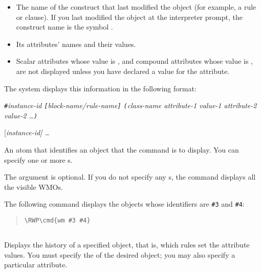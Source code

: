 {{\begin{itemize}
\item The name of the construct that last modified the object (for
  example, a rule or  clause). If you last modified the object
  at the interpreter prompt, the construct name is the symbol .

\item Its attributes' names and their values.

\item Scalar attributes whose value is , and compound attributes
  whose value is , are not displayed unless you have
  declared a  value for the attribute.
\end{itemize}

The system displays this information in the following format:

\verb|#|\it{instance-id} \verb|[|\it{block-name/rule-name}\verb|]| \verb|(|\it{class-name} \it{attribute-1} \it{value-1} \it{attribute-2} \it{value-2} \ldots\verb|)|

\Format

 [\it{instance-id}] \ldots

\begin{arguments}
\item[instance-id]

  An  atom that identifies an object that the command
  is to display. You can specify one or more s.

  The argument is optional. If you do not specify any s,
  the command displays all the visible WMOs.
\end{arguments}

\Example

The following command displays the objects whose identifiers are
\verb|#3| and \verb|#4|:

\begin{quote}
\begin{Verbatim}[commandchars=\\\{\}]
\RWP\cmd{wm #3 #4}
\end{Verbatim}
\end{quote}

\subsection{}

Displays the history of a specified object, that is, which rules set
the attribute values. You must specify the  of the desired
object; you may also specify a particular attribute.

}}
